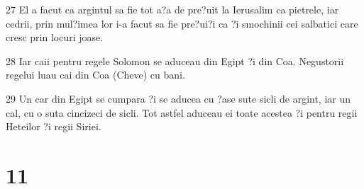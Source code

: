 \par 27 El a facut ca argintul sa fie tot a?a de pre?uit la Ierusalim ca pietrele, iar cedrii, prin mul?imea lor i-a facut sa fie pre?ui?i ca ?i smochinii cei salbatici care cresc prin locuri joase.
\par 28 Iar caii pentru regele Solomon se aduceau din Egipt ?i din Coa. Negustorii regelui luau cai din Coa (Cheve) cu bani.
\par 29 Un car din Egipt se cumpara ?i se aducea cu ?ase sute sicli de argint, iar un cal, cu o suta cincizeci de sicli. Tot astfel aduceau ei toate acestea ?i pentru regii Heteilor ?i regii Siriei.

\chapter{11}

